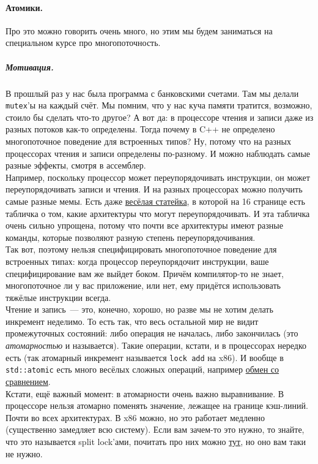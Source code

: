 \documentclass{article}
\begin{document}
    \paragraph{Атомики.}
    Про это можно говорить очень много, но этим мы будем заниматься на специальном курсе про многопоточность.
    \subparagraph{Мотивация.}
    В прошлый раз у нас была программа с банковскими счетами. Там мы делали \Verb|mutex|'ы на каждый счёт. Мы помним, что у нас куча памяти тратится, возможно, стоило бы сделать что-то другое? А вот да: в процессоре чтения и записи даже из разных потоков как-то определены. Тогда почему в C++ не определено многопоточное поведение для встроенных типов? Ну, потому что на разных процессорах чтения и записи определены по-разному. И можно наблюдать самые разные эффекты, смотря в ассемблер.\\
    Например, поскольку процессор может переупорядочивать инструкции, он может переупорядочивать записи и чтения. И на разных процессорах можно получить самые разные мемы. Есть даже \href{http://www.rdrop.com/users/paulmck/scalability/paper/whymb.2010.06.07c.pdf}{весёлая статейка}, в которой на 16 странице есть табличка о том, какие архитектуры что могут переупорядочивать. И эта табличка очень сильно упрощена, потому что почти все архитектуры имеют разные команды, которые позволяют разную степень переупорядочивания.\\
    Так вот, поэтому нельзя специфицировать многопоточное поведение для встроенных типах: когда процессор переупорядочит инструкции, ваше специфицирование вам же выйдет боком. Причём компилятор-то не знает, многопоточное ли у вас приложение, или нет, ему придётся использовать тяжёлые инструкции всегда.\\
    Чтение и запись~--- это, конечно, хорошо, но разве мы не хотим делать инкремент неделимо. То есть так, что весь остальной мир не видит промежуточных состояний: либо операция не началась, либо закончилась (это \textit{атомарностью} и называется). Такие операции, кстати, и в процессорах нередко есть (так атомарный инкремент называется \texttt{lock add} на x86). И вообще в \texttt{std::atomic} есть много весёлых сложных операций, например \href{https://en.cppreference.com/w/cpp/atomic/atomic/compare_exchange}{обмен со сравнением}.\\
    Кстати, ещё важный момент: в атомарности очень важно выравнивание. В процессоре нельзя атомарно поменять значение, лежащее на границе кэш-линий. Почти во всех архитектурах. В x86 можно, но это работает медленно (существенно замедляет всю систему). Если вам зачем-то это нужно, то знайте, что это называется split lock'ами, почитать про них можно \href{https://lwn.net/Articles/790464/}{тут}, но оно вам таки не нужно.
\end{document}
